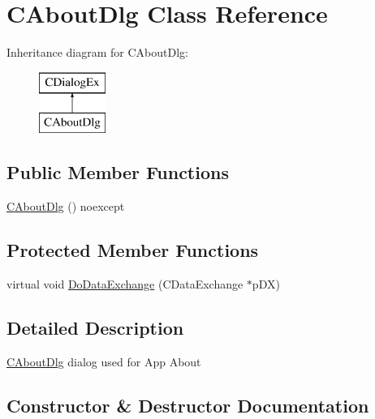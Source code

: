\hypertarget{class_c_about_dlg}{}\section{C\+About\+Dlg Class Reference}
\label{class_c_about_dlg}
Inheritance diagram for C\+About\+Dlg\+:\begin{figure}[H]
\begin{center}
\leavevmode
\includegraphics[height=2.000000cm]{class_c_about_dlg}
\end{center}
\end{figure}
\subsection*{Public Member Functions}
\begin{DoxyCompactItemize}
\item 
\mbox{\hyperlink{class_c_about_dlg_a2482a6b74da28cfc05a47a5cea4a1ac6}{C\+About\+Dlg}} () noexcept
\end{DoxyCompactItemize}
\subsection*{Protected Member Functions}
\begin{DoxyCompactItemize}
\item 
virtual void \mbox{\hyperlink{class_c_about_dlg_ab83db7484fec957282d7d5a21aed4df4}{Do\+Data\+Exchange}} (C\+Data\+Exchange $\ast$p\+DX)
\end{DoxyCompactItemize}


\subsection{Detailed Description}
\mbox{\hyperlink{class_c_about_dlg}{C\+About\+Dlg}} dialog used for App About 

\subsection{Constructor \& Destructor Documentation}
\mbox{\label{class_c_about_dlg_a2482a6b74da28cfc05a47a5cea4a1ac6}} 
